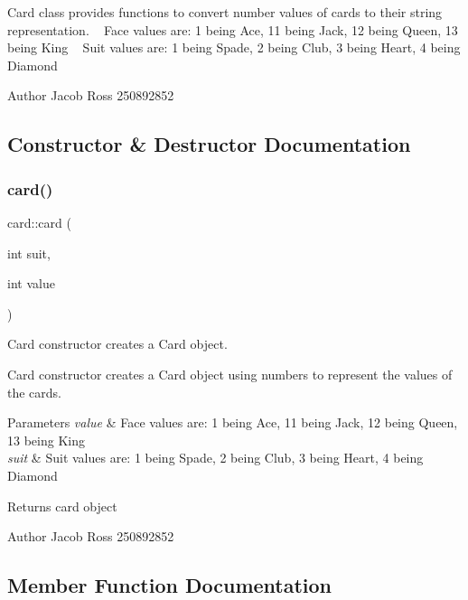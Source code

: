 Card class provides functions to convert number values of cards to their string representation. ~\newline
Face values are\+: 1 being Ace, 11 being Jack, 12 being Queen, 13 being King ~\newline
Suit values are\+: 1 being Spade, 2 being Club, 3 being Heart, 4 being Diamond \begin{DoxyAuthor}{Author}
Jacob Ross 250892852 
\end{DoxyAuthor}


\subsection{Constructor \& Destructor Documentation}
\mbox{\label{classcard_acfb86f1ab0161ad4445c6d08c2aa5bb5}} 
\subsubsection{\texorpdfstring{card()}{card()}}
{\footnotesize\ttfamily card\+::card (\begin{DoxyParamCaption}\item[{int}]{suit,  }\item[{int}]{value }\end{DoxyParamCaption})}



Card constructor creates a Card object. 

Card constructor creates a Card object using numbers to represent the values of the cards. 
\begin{DoxyParams}{Parameters}
{\em value} & Face values are\+: 1 being Ace, 11 being Jack, 12 being Queen, 13 being King \\
\hline
{\em suit} & Suit values are\+: 1 being Spade, 2 being Club, 3 being Heart, 4 being Diamond \\
\hline
\end{DoxyParams}
\begin{DoxyReturn}{Returns}
card object 
\end{DoxyReturn}
\begin{DoxyAuthor}{Author}
Jacob Ross 250892852 
\end{DoxyAuthor}


\subsection{Member Function Documentation}
\mbox{\label{classcard_a952559b02cf7d0c468fb4d89e145ad48}} 
